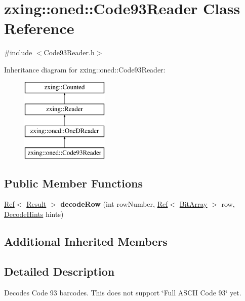 \hypertarget{classzxing_1_1oned_1_1_code93_reader}{}\section{zxing\+:\+:oned\+:\+:Code93\+Reader Class Reference}
\label{classzxing_1_1oned_1_1_code93_reader}


{\ttfamily \#include $<$Code93\+Reader.\+h$>$}

Inheritance diagram for zxing\+:\+:oned\+:\+:Code93\+Reader\+:\begin{figure}[H]
\begin{center}
\leavevmode
\includegraphics[height=4.000000cm]{classzxing_1_1oned_1_1_code93_reader}
\end{center}
\end{figure}
\subsection*{Public Member Functions}
\begin{DoxyCompactItemize}
\item 
\mbox{\label{classzxing_1_1oned_1_1_code93_reader_ad000b04ff28b468b8ba56b8eb7ecf478}} 
\mbox{\hyperlink{classzxing_1_1_ref}{Ref}}$<$ \mbox{\hyperlink{classzxing_1_1_result}{Result}} $>$ {\bfseries decode\+Row} (int row\+Number, \mbox{\hyperlink{classzxing_1_1_ref}{Ref}}$<$ \mbox{\hyperlink{classzxing_1_1_bit_array}{Bit\+Array}} $>$ row, \mbox{\hyperlink{classzxing_1_1_decode_hints}{Decode\+Hints}} hints)
\end{DoxyCompactItemize}
\subsection*{Additional Inherited Members}


\subsection{Detailed Description}
Decodes Code 93 barcodes. This does not support \char`\"{}\+Full A\+S\+C\+I\+I Code 93\char`\"{} yet.

